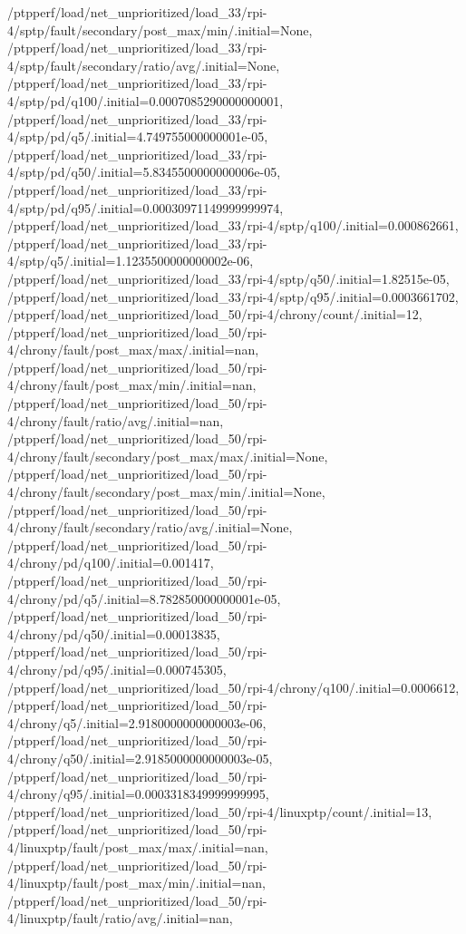 {    /ptpperf/load/net_unprioritized/load_33/rpi-4/sptp/fault/secondary/post_max/min/.initial=None,
    /ptpperf/load/net_unprioritized/load_33/rpi-4/sptp/fault/secondary/ratio/avg/.initial=None,
    /ptpperf/load/net_unprioritized/load_33/rpi-4/sptp/pd/q100/.initial=0.0007085290000000001,
    /ptpperf/load/net_unprioritized/load_33/rpi-4/sptp/pd/q5/.initial=4.749755000000001e-05,
    /ptpperf/load/net_unprioritized/load_33/rpi-4/sptp/pd/q50/.initial=5.8345500000000006e-05,
    /ptpperf/load/net_unprioritized/load_33/rpi-4/sptp/pd/q95/.initial=0.00030971149999999974,
    /ptpperf/load/net_unprioritized/load_33/rpi-4/sptp/q100/.initial=0.000862661,
    /ptpperf/load/net_unprioritized/load_33/rpi-4/sptp/q5/.initial=1.1235500000000002e-06,
    /ptpperf/load/net_unprioritized/load_33/rpi-4/sptp/q50/.initial=1.82515e-05,
    /ptpperf/load/net_unprioritized/load_33/rpi-4/sptp/q95/.initial=0.0003661702,
    /ptpperf/load/net_unprioritized/load_50/rpi-4/chrony/count/.initial=12,
    /ptpperf/load/net_unprioritized/load_50/rpi-4/chrony/fault/post_max/max/.initial=nan,
    /ptpperf/load/net_unprioritized/load_50/rpi-4/chrony/fault/post_max/min/.initial=nan,
    /ptpperf/load/net_unprioritized/load_50/rpi-4/chrony/fault/ratio/avg/.initial=nan,
    /ptpperf/load/net_unprioritized/load_50/rpi-4/chrony/fault/secondary/post_max/max/.initial=None,
    /ptpperf/load/net_unprioritized/load_50/rpi-4/chrony/fault/secondary/post_max/min/.initial=None,
    /ptpperf/load/net_unprioritized/load_50/rpi-4/chrony/fault/secondary/ratio/avg/.initial=None,
    /ptpperf/load/net_unprioritized/load_50/rpi-4/chrony/pd/q100/.initial=0.001417,
    /ptpperf/load/net_unprioritized/load_50/rpi-4/chrony/pd/q5/.initial=8.782850000000001e-05,
    /ptpperf/load/net_unprioritized/load_50/rpi-4/chrony/pd/q50/.initial=0.00013835,
    /ptpperf/load/net_unprioritized/load_50/rpi-4/chrony/pd/q95/.initial=0.000745305,
    /ptpperf/load/net_unprioritized/load_50/rpi-4/chrony/q100/.initial=0.0006612,
    /ptpperf/load/net_unprioritized/load_50/rpi-4/chrony/q5/.initial=2.9180000000000003e-06,
    /ptpperf/load/net_unprioritized/load_50/rpi-4/chrony/q50/.initial=2.9185000000000003e-05,
    /ptpperf/load/net_unprioritized/load_50/rpi-4/chrony/q95/.initial=0.0003318349999999995,
    /ptpperf/load/net_unprioritized/load_50/rpi-4/linuxptp/count/.initial=13,
    /ptpperf/load/net_unprioritized/load_50/rpi-4/linuxptp/fault/post_max/max/.initial=nan,
    /ptpperf/load/net_unprioritized/load_50/rpi-4/linuxptp/fault/post_max/min/.initial=nan,
    /ptpperf/load/net_unprioritized/load_50/rpi-4/linuxptp/fault/ratio/avg/.initial=nan,
}
